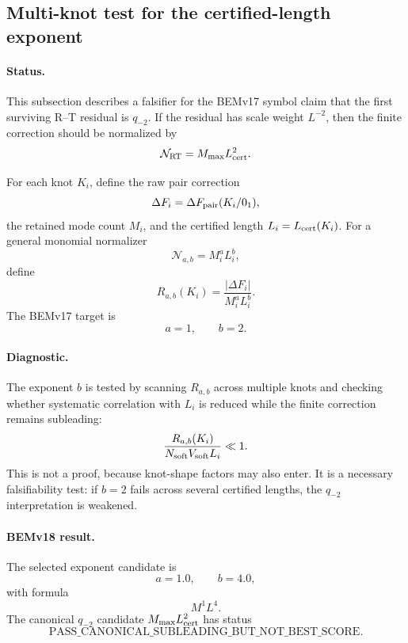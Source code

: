 
\subsection{Multi-knot test for the certified-length exponent}

\paragraph{Status.}
This subsection describes a falsifier for the BEMv17 symbol claim that the
first surviving R--T residual is \(q_{-2}\).  If the residual has scale weight
\(L^{-2}\), then the finite correction should be normalized by
\[
\mathcal N_{\rm RT}=M_{\max}L_{\rm cert}^{2}.
\]

For each knot \(K_i\), define the raw pair correction
\[
\Delta F_i=\Delta F_{\rm pair}(K_i/0_1),
\]
the retained mode count \(M_i\), and the certified length \(L_i=L_{\rm cert}(K_i)\).
For a general monomial normalizer
\[
\mathcal N_{a,b}=M_i^a L_i^b,
\]
define
\[
R_{a,b}(K_i)=
\frac{|\Delta F_i|}
{M_i^aL_i^b}.
\]
The BEMv17 target is
\[
a=1,\qquad b=2.
\]

\paragraph{Diagnostic.}
The exponent \(b\) is tested by scanning \(R_{a,b}\) across multiple knots and
checking whether systematic correlation with \(L_i\) is reduced while the
finite correction remains subleading:
\[
\frac{R_{a,b}(K_i)}
{N_{\rm soft}V_{\rm soft}L_i}
\ll 1.
\]
This is not a proof, because knot-shape factors may also enter.  It is a
necessary falsifiability test: if \(b=2\) fails across several certified
lengths, the \(q_{-2}\) interpretation is weakened.

\paragraph{BEMv18 result.}
The selected exponent candidate is
\[
a=1.0,\qquad b=4.0,
\]
with formula
\[
M^1 L^4.
\]
The canonical \(q_{-2}\) candidate \(M_{\max}L_{\rm cert}^{2}\) has status
\[
\boxed{\text{PASS_CANONICAL_SUBLEADING_BUT_NOT_BEST_SCORE}}.
\]
